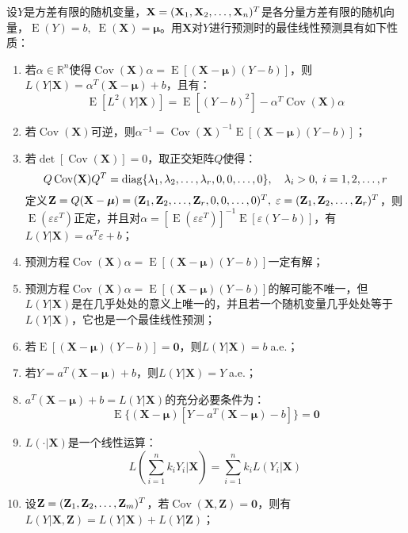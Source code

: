 \begin{property}
	设$Y$是方差有限的随机变量，$\mathbf{X}=(\mathbf{X}_1, \mathbf{X}_2, \dots, \mathbf{X}_{n})^T$是各分量方差有限的随机向量，$\operatorname{E}(Y)=b,\;\operatorname{E}(\mathbf{X})=\boldsymbol{\mu}$。用$\mathbf{X}$对$Y$进行预测时的最佳线性预测具有如下性质：
	\begin{enumerate}
		\item 若$\alpha\in\mathbb{R}^{n}$使得$\operatorname{Cov}(\mathbf{X})\alpha=\operatorname{E}[(\mathbf{X}-\boldsymbol{\mu})(Y-b)]$，则$L(Y|\mathbf{X})=\alpha^T(\mathbf{X}-\boldsymbol{\mu})+b$，且有：
		\begin{equation*}
			\operatorname{E}[L^2(Y|\mathbf{X})]=\operatorname{E}[(Y-b)^2]-\alpha^T\operatorname{Cov}(\mathbf{X})\alpha
		\end{equation*}
		\item 若$\operatorname{Cov}(\mathbf{X})$可逆，则$\alpha^{-1}=\operatorname{Cov}(\mathbf{X})^{-1}\operatorname{E}[(\mathbf{X}-\boldsymbol{\mu})(Y-b)]$；
		\item 若$\det[\operatorname{Cov}(\mathbf{X})]=0$，取正交矩阵$Q$使得：
		\begin{equation*}
			Q\operatorname{Cov}(\mathbf{X})Q^T=\operatorname{diag}\{\lambda_1, \lambda_2, \dots, \lambda_{r},0,0,\dots,0\},\quad\lambda_i>0,\;i=1,2,\dots,r
		\end{equation*}
		定义$\mathbf{Z}=Q(\mathbf{X}-\boldsymbol{\mu})=(\mathbf{Z}_1, \mathbf{Z}_2, \dots, \mathbf{Z}_{r},0,0,\dots,0)^T,\;\varepsilon=(\mathbf{Z}_1, \mathbf{Z}_2, \dots, \mathbf{Z}_{r})^T$，则$\operatorname{E}(\varepsilon\varepsilon^T)$正定，并且对$\alpha=[\operatorname{E}(\varepsilon\varepsilon^T)]^{-1}\operatorname{E}[\varepsilon(Y-b)]$，有$L(Y|\mathbf{X})=\alpha^T\varepsilon+b$；
		\item 预测方程$\operatorname{Cov}(\mathbf{X})\alpha=\operatorname{E}[(\mathbf{X}-\boldsymbol{\mu})(Y-b)]$一定有解；
		\item 预测方程$\operatorname{Cov}(\mathbf{X})\alpha=\operatorname{E}[(\mathbf{X}-\boldsymbol{\mu})(Y-b)]$的解可能不唯一，但$L(Y|\mathbf{X})$是在几乎处处的意义上唯一的，并且若一个随机变量几乎处处等于$L(Y|\mathbf{X})$，它也是一个最佳线性预测；
		\item 若$\operatorname{E}[(\mathbf{X}-\boldsymbol{\mu})(Y-b)]=\mathbf{0}$，则$L(Y|\mathbf{X})=b\;$a.e.；
		\item 若$Y=a^T(\mathbf{X}-\boldsymbol{\mu})+b$，则$L(Y|\mathbf{X})=Y\;$a.e.；
		\item
		$a^T(\mathbf{X}-\boldsymbol{\mu})+b=L(Y|\mathbf{X})$的充分必要条件为：
		\begin{equation*}
			\operatorname{E}\{(\mathbf{X}-\boldsymbol{\mu})[Y-a^T(\mathbf{X}-\boldsymbol{\mu})-b]\}=\mathbf{0}
		\end{equation*}
		\item $L(\cdot|\mathbf{X})$是一个线性运算：
		\begin{equation*}
			L\left(\sum_{i=1}^{n}k_iY_i|\mathbf{X}\right)=\sum_{i=1}^{n}k_iL(Y_i|\mathbf{X})
		\end{equation*}
		\item 设$\mathbf{Z}=(\mathbf{Z}_1, \mathbf{Z}_2, \dots, \mathbf{Z}_{m})^T$，若$\operatorname{Cov}(\mathbf{X},\mathbf{Z})=\mathbf{0}$，则有$L(Y|\mathbf{X},\mathbf{Z})=L(Y|\mathbf{X})+L(Y|\mathbf{Z})$；
	\end{enumerate}
\end{property}
